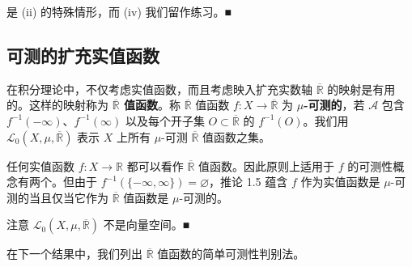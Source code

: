 \begin{theorem}
\begin{subitems}
\item[（iii）]

是 (ii) 的特殊情形，而 (iv) 我们留作练习。\nobreak\hspace{0.35em}■

\end{subitems}

\end{theorem}

\subsection*{可测的扩充实值函数}

在积分理论中，不仅考虑实值函数，而且考虑映入扩充实数轴 $ \overline{\mathbb{R}} $ 的映射是有用的。这样的映射称为 \textbf{$ \overline{\mathbb{R}} $ 值函数}。称 $ \overline{\mathbb{R}} $ 值函数 $ f: X \to \overline{\mathbb{R}} $ 为 \textbf{$ \mu $-可测的}，若 $ \mathcal{A} $ 包含 $ f^{-1}(-\infty) $、$ f^{-1}(\infty) $ 以及每个开子集 $ O \subset \overline{\mathbb{R}} $ 的 $ f^{-1}(O) $。我们用 $ \mathcal{L}_0(X,\mu,\overline{\mathbb{R}}) $ 表示 $ X $ 上所有 $ \mu $-可测 $ \overline{\mathbb{R}} $ 值函数之集。

\begin{remark}

\begin{items}
\item

任何实值函数 $ f: X \to \mathbb{R} $ 都可以看作 $ \overline{\mathbb{R}} $ 值函数。因此原则上适用于 $ f $ 的可测性概念有两个。但由于 $ f^{-1}(\{-\infty,\infty\}) = \varnothing $，推论 1.5 蕴含 $ f $ 作为实值函数是 $ \mu $-可测的当且仅当它作为 $ \overline{\mathbb{R}} $ 值函数是 $ \mu $-可测的。

\item

注意 $ \mathcal{L}_0(X,\mu,\overline{\mathbb{R}}) $ 不是向量空间。\nobreak\hspace{0.35em}■

\end{items}

在下一个结果中，我们列出 $ \overline{\mathbb{R}} $ 值函数的简单可测性判别法。

\end{remark}

